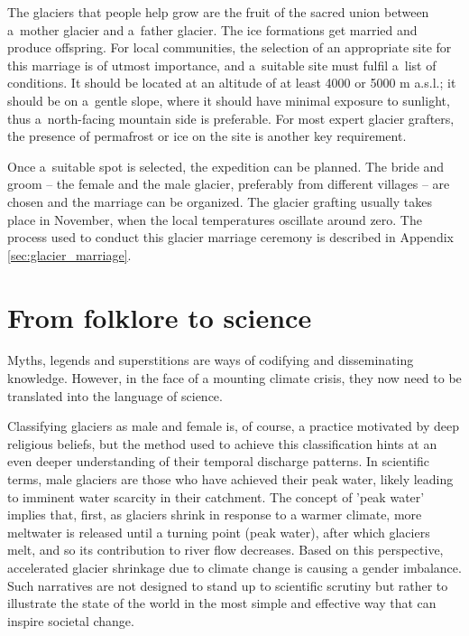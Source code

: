 The glaciers that people help grow are the fruit of the sacred union between a mother glacier and a father
glacier. The ice formations get married and produce offspring. For local communities, the selection of an
appropriate site for this marriage is of utmost importance, and a suitable site must fulfil a list of
conditions. It should be located at an altitude of at least 4000 or 5000 m \ac{a.s.l.}; it should be on
a gentle slope, where it should have minimal exposure to sunlight, thus a north-facing mountain side is
preferable. For most expert glacier grafters, the presence of permafrost or ice on the site is another key
requirement. 

Once a suitable spot is selected, the expedition can be planned. The bride and groom – the female and the male
glacier, preferably from different villages – are chosen and the marriage can be organized. The glacier grafting
usually takes place in November, when the local temperatures oscillate around zero. The process used to conduct
this glacier marriage ceremony is described in Appendix \ref{sec:glacier_marriage}.

\section{From folklore to science}

Myths, legends and superstitions are ways of codifying and disseminating knowledge. However, in the face of a
mounting climate crisis, they now need to be translated into the language of science. 


Classifying glaciers as male and female is, of course, a practice motivated by deep religious beliefs, but the
method used to achieve this classification hints at an even deeper understanding of their temporal discharge
patterns. In scientific terms, male glaciers are those who have achieved their peak water, likely leading to
imminent water scarcity in their catchment. The concept of 'peak water' implies that, first, as glaciers shrink
in response to a warmer climate, more meltwater is released until a turning point (peak water), after which
glaciers melt, and so its contribution to river flow decreases.  Based on this perspective, accelerated glacier
shrinkage due to climate change is causing a gender imbalance.  Such narratives are not designed to stand up to
scientific scrutiny but rather to illustrate the state of the world in the most simple and effective way that
can inspire societal change. 

